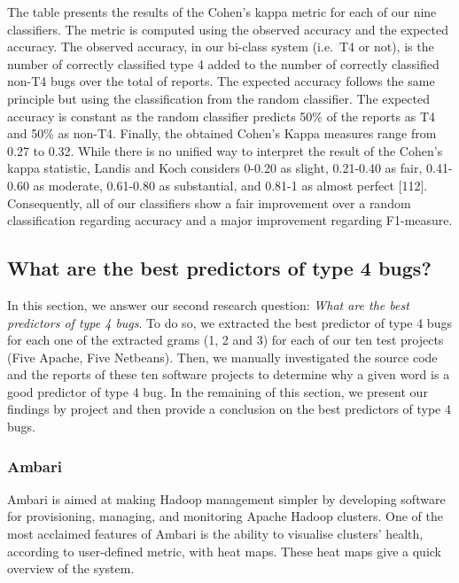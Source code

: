 \documentclass[12pt]{report}
\begin{document}
The table presents the results of the Cohen's kappa metric for each of
our nine classifiers. The metric is computed using the observed accuracy
and the expected accuracy. The observed accuracy, in our bi-class system
(i.e.~T4 or not), is the number of correctly classified type 4 added to
the number of correctly classified non-T4 bugs over the total of
reports. The expected accuracy follows the same principle but using the
classification from the random classifier. The expected accuracy is
constant as the random classifier predicts 50\% of the reports as T4 and
50\% as non-T4. Finally, the obtained Cohen's Kappa measures range from
0.27 to 0.32. While there is no unified way to interpret the result of
the Cohen's kappa statistic, Landis and Koch considers 0-0.20 as slight,
0.21-0.40 as fair, 0.41-0.60 as moderate, 0.61-0.80 as substantial, and
0.81-1 as almost perfect {[}112{]}. Consequently, all of our classifiers
show a fair improvement over a random classification regarding accuracy
and a major improvement regarding F1-measure.

\subsection{What are the best predictors of type 4
bugs?}\label{what-are-the-best-predictors-of-type-4-bugs}

In this section, we answer our second research question: \emph{What are
the best predictors of type 4 bugs}. To do so, we extracted the best
predictor of type 4 bugs for each one of the extracted grams (1, 2 and
3) for each of our ten test projects (Five Apache, Five Netbeans). Then,
we manually investigated the source code and the reports of these ten
software projects to determine why a given word is a good predictor of
type 4 bug. In the remaining of this section, we present our findings by
project and then provide a conclusion on the best predictors of type 4
bugs.

\subsubsection{Ambari}\label{ambari}

Ambari is aimed at making Hadoop management simpler by developing
software for provisioning, managing, and monitoring Apache Hadoop
clusters. One of the most acclaimed features of Ambari is the ability to
visualise clusters' health, according to user-defined metric, with heat
maps. These heat maps give a quick overview of the system.
\end{document}
